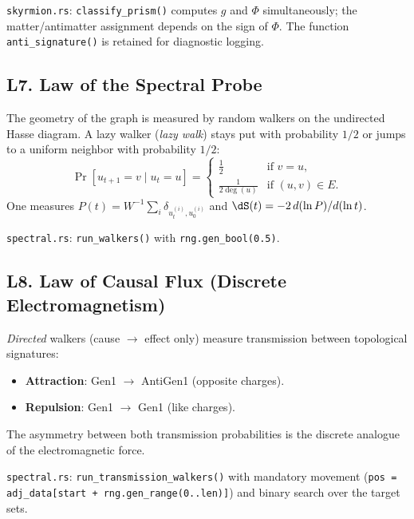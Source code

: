 \medskip\noindent
\texttt{skyrmion.rs}: \texttt{classify\_prism()} computes $g$ and
$\Phi$ simultaneously; the matter/antimatter assignment
depends on the sign of $\Phi$.  The function
\texttt{anti\_signature()} is retained for diagnostic logging.


\subsection*{L7. Law of the Spectral Probe}
\label{law:spectral-probe}

The geometry of the graph is measured by random walkers
on the undirected Hasse diagram. A lazy walker
(\emph{lazy walk}) stays put with probability $1/2$ or jumps to a
uniform neighbor with probability $1/2$:
\begin{equation}
  \Pr[u_{t+1} = v \mid u_t = u] =
  \begin{cases}
    \frac{1}{2} & \text{if } v = u,\\[4pt]
    \frac{1}{2\deg(u)} & \text{if } (u,v) \in E.
  \end{cases}
  \label{eq:law-lazy}
\end{equation}
One measures $P(t) = W^{-1}\sum_i \delta_{u_t^{(i)}, u_0^{(i)}}$ and
$\dS(t) = -2\,d(\ln P)/d(\ln t)$.

\medskip\noindent
\texttt{spectral.rs}: \texttt{run\_walkers()} with
\texttt{rng.gen\_bool(0.5)}.

\subsection*{L8. Law of Causal Flux (Discrete Electromagnetism)}
\label{law:causal-flux}

\emph{Directed} walkers (cause $\to$ effect only) measure
transmission between topological signatures:
\begin{itemize}
  \item \textbf{Attraction}: Gen1 $\to$ AntiGen1 (opposite charges).
  \item \textbf{Repulsion}: Gen1 $\to$ Gen1 (like charges).
\end{itemize}
The asymmetry between both transmission probabilities is
the discrete analogue of the electromagnetic force.

\medskip\noindent
\texttt{spectral.rs}: \texttt{run\_transmission\_walkers()}
with mandatory movement (\texttt{pos = adj\_data[start +
rng.gen\_range(0..len)]}) and binary search over the
target sets.

